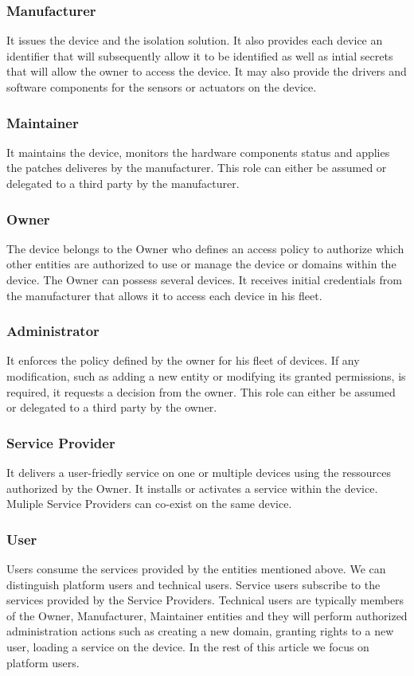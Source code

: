 \documentclass[conference]{IEEEtran}
\begin{document}
\subsubsection{Manufacturer}
It issues the device and the isolation solution. It also provides each device an identifier that will subsequently allow it to be identified as well as intial secrets that will allow the owner to access the device. It may also provide the drivers and software components for the sensors or actuators on the device. 
\subsubsection{Maintainer}
It maintains the device, monitors the hardware components status and applies the patches deliveres by the manufacturer. This role can either be assumed or delegated to a third party by the manufacturer. 
\subsubsection{Owner}
The device belongs to the Owner who defines an access policy to authorize which other entities are authorized to use or manage the device or domains within the device. The Owner can possess several devices. It receives initial credentials from the manufacturer that allows it to access each device in his fleet. 
\subsubsection{Administrator}
It enforces the policy defined by the owner for his fleet of devices. If any modification, such as adding a new entity or modifying its granted permissions,  is required, it requests a decision from the owner. This role can either be assumed or delegated to a third party by the owner. 
\subsubsection{Service Provider}
It delivers a user-friedly service on one or multiple devices using the ressources authorized by the Owner. It installs or activates a service within the device. Muliple Service Providers can co-exist on the same device. 
\subsubsection{User}
Users consume the services provided by the entities mentioned above. We can distinguish platform users and technical users. Service users subscribe to the services provided by the Service Providers. Technical users are typically members of the Owner, Manufacturer, Maintainer entities and they will perform authorized administration actions such as creating a new domain, granting rights to a new user, loading a service on the device. In the rest of this article we focus on platform users. 
\end{document}

